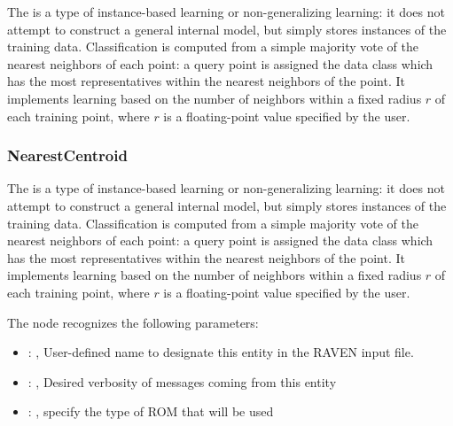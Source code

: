  The  is a type of instance-based learning or
 non-generalizing learning: it does not attempt to construct a general internal
 model, but simply stores instances of the training data.                          Classification is
 computed from a simple majority vote of the nearest neighbors                          of each
 point: a query point is assigned the data class which has the most
 representatives within the nearest neighbors of the point.                          It implements
 learning based on the number of neighbors within a fixed radius                          $r$ of
 each training point, where $r$ is a floating-point value specified by the
 user.                          

\subsubsection{NearestCentroid}
  The  is a type of instance-based learning or
  non-generalizing learning: it does not attempt to construct a general internal
  model, but simply stores instances of the training data.                          Classification
  is computed from a simple majority vote of the nearest neighbors                          of each
  point: a query point is assigned the data class which has the most
  representatives within the nearest neighbors of the point.                          It implements
  learning based on the number of neighbors within a fixed radius                          $r$ of
  each training point, where $r$ is a floating-point value specified by the
  user.                          

  The  node recognizes the following parameters:
    \begin{itemize}
      \item {}: , 
        User-defined name to designate this entity in the RAVEN input file.
      \item {}: , 
        Desired verbosity of messages coming from this entity
      \item {}: , 
        specify the type of ROM that will be used
  \end{itemize}

